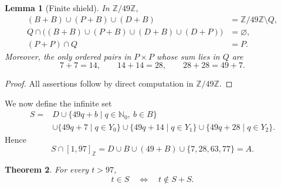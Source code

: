 \documentclass[11pt,letterpaper]{article}
\newtheorem{theorem}{Theorem}[section]
\newtheorem{lemma}[theorem]{Lemma}
\newcommand{\Nzero}{\mathbb{N}_0}
\newcommand{\Zfortynine}{\mathbb{Z}/49\mathbb{Z}}
\newcommand{\ints}[2]{[#1,#2]_{\mathbb{Z}}}
\begin{document}
\begin{lemma}[Finite shield]\label{lem:shield}
In \(\Zfortynine\),
\begin{align}
(B+B)\cup(P+B)\cup(D+B)&=\Zfortynine\setminus Q, \label{eq:cover-mod}\\
Q\cap\bigl((B+B)\cup(P+B)\cup(D+B)\cup(D+P)\bigr)
&=\varnothing,                                         \label{eq:avoid-mod}\\
(P+P)\cap Q&=P.                                        \label{eq:PP-mod}
\end{align}
Moreover, the only ordered pairs in \(P\times P\) whose sum lies in \(Q\) are
\begin{equation}\label{eq:diagonal-pairs}
7+7=14,
\qquad
14+14=28,
\qquad
28+28=49+7.
\end{equation}
\end{lemma}

\begin{proof}
All assertions follow by direct computation in \(\Zfortynine\).
\end{proof}

We now define the infinite set
\begin{equation}
\begin{split}
S={}&D\cup\{49q+b\mid q\in\Nzero,\ b\in B\}\\
&\cup\{49q+7\mid q\in Y_0\}
 \cup\{49q+14\mid q\in Y_1\}
 \cup\{49q+28\mid q\in Y_2\}.
\end{split}
\end{equation}
Hence
\begin{equation}\label{eq:seed-prefix}
S\cap\ints{1}{97}=D\cup B\cup(49+B)\cup\{7,28,63,77\}=A.
\end{equation}

\begin{theorem}\label{thm:recurrence}
For every \(t>97\),
\begin{equation}\label{eq:main-recurrence}
t\in S
\quad\Longleftrightarrow\quad
t\notin S+S.
\end{equation}
\end{theorem}
\end{document}
